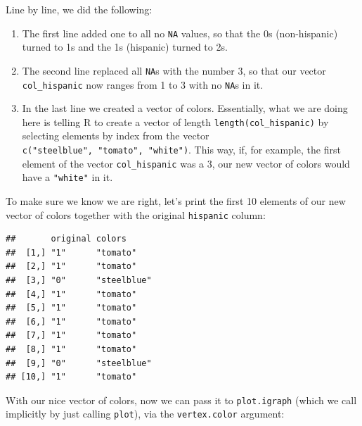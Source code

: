 \documentclass[]{book}
\newenvironment{Shaded}{\begin{snugshade}}{\end{snugshade}}
\newcommand{\KeywordTok}[1]{\textcolor[rgb]{0.13,0.29,0.53}{\textbf{#1}}}
\newcommand{\DataTypeTok}[1]{\textcolor[rgb]{0.13,0.29,0.53}{#1}}
\newcommand{\DecValTok}[1]{\textcolor[rgb]{0.00,0.00,0.81}{#1}}
\newcommand{\OperatorTok}[1]{\textcolor[rgb]{0.81,0.36,0.00}{\textbf{#1}}}
\newcommand{\NormalTok}[1]{#1}
\theoremstyle{definition}
\theoremstyle{definition}
\theoremstyle{definition}
\theoremstyle{remark}
\begin{document}
Line by line, we did the following:

\begin{enumerate}
\def\labelenumi{\arabic{enumi}.}
\item
  The first line added one to all no \texttt{NA} values, so that the 0s
  (non-hispanic) turned to 1s and the 1s (hispanic) turned to 2s.
\item
  The second line replaced all \texttt{NA}s with the number 3, so that
  our vector \texttt{col\_hispanic} now ranges from 1 to 3 with no
  \texttt{NA}s in it.
\item
  In the last line we created a vector of colors. Essentially, what we
  are doing here is telling R to create a vector of length
  \texttt{length(col\_hispanic)} by selecting elements by index from the
  vector \texttt{c("steelblue",\ "tomato",\ "white")}. This way, if, for
  example, the first element of the vector \texttt{col\_hispanic} was a
  3, our new vector of colors would have a \texttt{"white"} in it.
\end{enumerate}

To make sure we know we are right, let's print the first 10 elements of
our new vector of colors together with the original \texttt{hispanic}
column:

\begin{Shaded}
\end{Shaded}

\begin{verbatim}
##       original colors     
##  [1,] "1"      "tomato"   
##  [2,] "1"      "tomato"   
##  [3,] "0"      "steelblue"
##  [4,] "1"      "tomato"   
##  [5,] "1"      "tomato"   
##  [6,] "1"      "tomato"   
##  [7,] "1"      "tomato"   
##  [8,] "1"      "tomato"   
##  [9,] "0"      "steelblue"
## [10,] "1"      "tomato"
\end{verbatim}

With our nice vector of colors, now we can pass it to
\texttt{plot.igraph} (which we call implicitly by just calling
\texttt{plot}), via the \texttt{vertex.color} argument:
\end{document}
